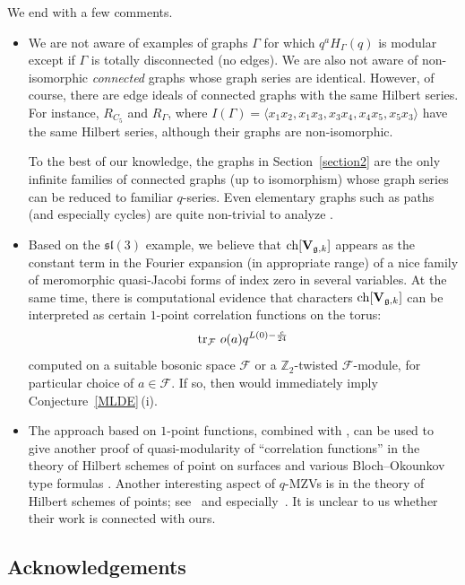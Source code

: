 \documentclass[pdftex]{sigma}
\numberwithin{equation}{section}
\theoremstyle{definition}
\begin{document}
We end with a few comments.
\begin{itemize}\itemsep=0pt
\item[(i)] We are not aware of examples of graphs $\Gamma$ for which $q^a H_{\Gamma}(q)$ is modular except if $\Gamma$ is totally disconnected (no edges). We are also not aware of non-isomorphic {\em connected} graphs whose graph series are identical.
However, of course, there are edge ideals of connected graphs with the same Hilbert series. For instance, $R_{C_5}$ and $R_{\Gamma}$, where $I(\Gamma)=\langle x_1 x_2,x_1 x_3,x_3 x_4,x_4 x_5,x_5 x_3 \rangle$ have the same Hilbert series, although their graphs are non-isomorphic.

To the best of our knowledge, the graphs in Section~\ref{section2} are the only infinite families of connected graphs (up to isomorphism) whose graph series can be reduced to familiar $q$-series. Even elementary graphs such as paths (and especially cycles) are quite non-trivial to analyze \cite{BJM}.

\item[(ii)] Based on the $\mathfrak{sl}(3)$ example, we believe that ${\rm ch}[\mathbf{V}_{\mathfrak{g},k}]$ appears as the constant term in the Fourier expansion (in appropriate range) of a nice family of meromorphic quasi-Jacobi forms of index zero in several variables. At the same time, there is computational evidence that characters ${\rm ch}[\mathbf{V}_{\mathfrak{g},k}]$ can be interpreted as certain
$1$-point correlation functions on the torus:
\[
{\rm tr}_{\mathcal{F}} \ o(a) q^{L(0)-\frac{c}{24}}
\]
computed on a suitable bosonic space $\mathcal{F}$ or a $\mathbb{Z}_2$-twisted $\mathcal{F}$-module, for particular choice of $a \in \mathcal{F}$. If so, then \cite{DMN} would immediately imply Conjecture~\ref{MLDE}\,(i).

\item[(iii)] The approach based on $1$-point functions, combined with \cite{M2, M1}, can be used to give another proof of quasi-modularity of ``correlation functions'' in the theory of Hilbert schemes of point on surfaces \cite{Carlsson} and various Bloch--Okounkov type formulas \cite{Ittersum}.
Another interesting aspect of $q$-MZVs is in the theory of Hilbert schemes of points; see~\cite{Okounkov} and especially~\cite{Qin}. It is unclear to us whether their work is connected with ours.
\end{itemize}

\subsection*{Acknowledgements}
\end{document}
